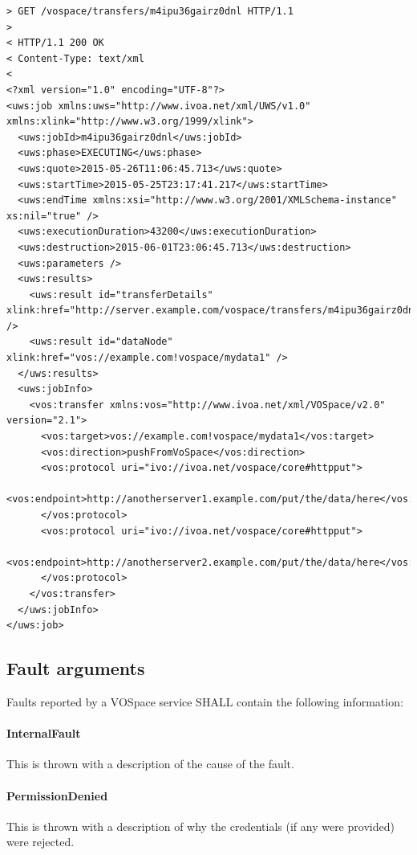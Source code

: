\documentclass[11pt,a4paper]{ivoa}
\begin{document}
\begin{lstlisting}
> GET /vospace/transfers/m4ipu36gairz0dnl HTTP/1.1
>
< HTTP/1.1 200 OK
< Content-Type: text/xml
<
<?xml version="1.0" encoding="UTF-8"?>
<uws:job xmlns:uws="http://www.ivoa.net/xml/UWS/v1.0" xmlns:xlink="http://www.w3.org/1999/xlink">
  <uws:jobId>m4ipu36gairz0dnl</uws:jobId>
  <uws:phase>EXECUTING</uws:phase>
  <uws:quote>2015-05-26T11:06:45.713</uws:quote>
  <uws:startTime>2015-05-25T23:17:41.217</uws:startTime>
  <uws:endTime xmlns:xsi="http://www.w3.org/2001/XMLSchema-instance" xs:nil="true" />
  <uws:executionDuration>43200</uws:executionDuration>
  <uws:destruction>2015-06-01T23:06:45.713</uws:destruction>
  <uws:parameters />
  <uws:results>
    <uws:result id="transferDetails" xlink:href="http://server.example.com/vospace/transfers/m4ipu36gairz0dnl/results/transferDetails" />
    <uws:result id="dataNode" xlink:href="vos://example.com!vospace/mydata1" />
  </uws:results>
  <uws:jobInfo>
    <vos:transfer xmlns:vos="http://www.ivoa.net/xml/VOSpace/v2.0" version="2.1">
      <vos:target>vos://example.com!vospace/mydata1</vos:target>
      <vos:direction>pushFromVoSpace</vos:direction>
      <vos:protocol uri="ivo://ivoa.net/vospace/core#httpput">
        <vos:endpoint>http://anotherserver1.example.com/put/the/data/here</vos:endpoint>
      </vos:protocol>
      <vos:protocol uri="ivo://ivoa.net/vospace/core#httpput">
        <vos:endpoint>http://anotherserver2.example.com/put/the/data/here</vos:endpoint>
      </vos:protocol>
    </vos:transfer>
  </uws:jobInfo>
</uws:job>
\end{lstlisting}

\subsection{Fault arguments}
\label{subsec:fault arguments}
Faults reported by a VOSpace service SHALL contain the following information:

\paragraph{InternalFault}
This is thrown with a description of the cause of the fault.

\paragraph{PermissionDenied}
This is thrown with a description of why the credentials (if any were provided) were rejected.
\end{document}
